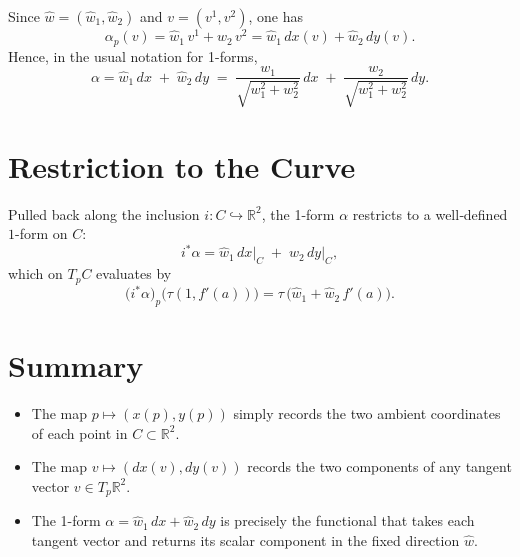 \documentclass[12pt]{article}
\theoremstyle{definitionstyle}
\newcommand{\R}{\mathbb{R}}
\begin{document}
	Since
	\(\hat w=(\hat w_1,\hat w_2)\) and \(v=(v^1,v^2)\), one has
	\[
	\alpha_p(v)
	=\hat w_1\,v^1 + \hat w_2\,v^2
	=\hat w_1\,dx(v)+\hat w_2\,dy(v).
	\]
	Hence, in the usual notation for 1-forms,
	\[
	\boxed{
		\alpha
		=\hat w_1\,dx\;+\;\hat w_2\,dy
		\;=\;
		\frac{w_1}{\sqrt{w_1^2+w_2^2}}\,dx
		\;+\;
		\frac{w_2}{\sqrt{w_1^2+w_2^2}}\,dy.
	}
	\]
	
	\section{Restriction to the Curve}
	Pulled back along the inclusion \(i\colon C\hookrightarrow\R^2\), the 1-form
	\(\alpha\) restricts to a well‐defined \(1\)-form on \(C\):
	\[
	i^*\alpha
	=\hat w_1\,dx\big|_C \;+\;\hat w_2\,dy\big|_C,
	\]
	which on \(T_pC\) evaluates by
	\[
	\bigl(i^*\alpha\bigr)_p\bigl(\tau(1,f'(a))\bigr)
	=\tau\,\bigl(\hat w_1 + \hat w_2\,f'(a)\bigr).
	\]
	
	\section*{Summary}
	\begin{itemize}
		\item The map \(p\mapsto(x(p),y(p))\) simply records the two ambient coordinates
		of each point in \(C\subset\R^2\).
		\item The map \(v\mapsto(dx(v),dy(v))\) records the two components of any tangent
		vector \(v\in T_p\R^2\).
		\item The 1-form \(\alpha=\hat w_1\,dx+\hat w_2\,dy\) is precisely the functional
		that takes each tangent vector and returns its scalar component in the fixed
		direction \(\hat w\).
	\end{itemize}
	
\end{document}
